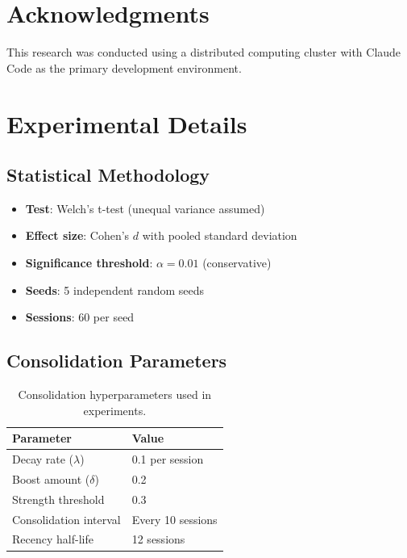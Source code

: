 \documentclass[11pt]{article}
\begin{document}
\section*{Acknowledgments}

This research was conducted using a distributed computing cluster with Claude Code as the primary development environment.




\appendix

\section{Experimental Details}

\subsection{Statistical Methodology}

\begin{itemize}
    \item \textbf{Test}: Welch's t-test (unequal variance assumed)
    \item \textbf{Effect size}: Cohen's $d$ with pooled standard deviation
    \item \textbf{Significance threshold}: $\alpha = 0.01$ (conservative)
    \item \textbf{Seeds}: 5 independent random seeds
    \item \textbf{Sessions}: 60 per seed
\end{itemize}

\subsection{Consolidation Parameters}

\begin{table}[h]
\centering
\begin{tabular}{@{}ll@{}}
\toprule
Parameter & Value \\
\midrule
Decay rate ($\lambda$) & 0.1 per session \\
Boost amount ($\delta$) & 0.2 \\
Strength threshold & 0.3 \\
Consolidation interval & Every 10 sessions \\
Recency half-life & 12 sessions \\
\bottomrule
\end{tabular}
\caption{Consolidation hyperparameters used in experiments.}
\end{table}
\end{document}
